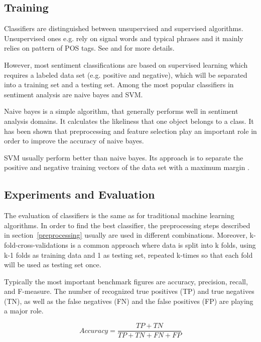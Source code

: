\documentclass{acm_proc_article-sp}
\begin{document}
\subsection{Training} Classifiers are distinguished between unsupervised and
supervised algorithms. Unsupervised ones e.g. rely on signal words and typical
phrases and it mainly relies on pattern of POS tags. See
\cite{liu2010sentimentanalysis} and \cite{pang2008opinion} for more details.

However, most sentiment classifications are based on supervised learning which
requires a labeled data set (e.g. positive and negative), which will be
separated into a training set and a testing set. Among the most popular
classifiers in sentiment analysis are naive bayes and SVM. 

Naive bayes is a simple algorithm, that generally performs well in sentiment
analysis domains. It calculates the likeliness that one object belongs to a
class. It has been shown that preprocessing and feature selection play an
important role in order to improve the accuracy of naive bayes.
\cite{ye2009sentiment, ting2011naive}

SVM usually perform better than naive bayes. Its approach is to separate the
positive and negative training vectors of the data set with a maximum margin
\cite{ye2009sentiment}.

\subsection{Experiments and Evaluation} The evaluation of classifiers is the
same as for traditional machine learning algorithms. In order to find the best
classifier, the preprocessing steps described in section~\ref{preprocessing}
usually are used in different combinations. Moreover, k-fold-cross-validations
is a common approach where data is split into k folds, using k-1 folds as
training data and 1 as testing set, repeated k-times so that each fold will be
used as testing set once. 

Typically the most important benchmark figures are accuracy, precision, recall,
and F-measure. The number of recognized true positives (TP) and true negatives
(TN), as well as the false negatives (FN) and the false positives (FP) are
playing a major role.  \cite{haddi2013therole, ting2011naive,
sokolova2006beyond, pak2010twitter, ye2009sentiment}


\begin{equation} Accuracy = \frac{TP+TN}{TP+TN+FN+FP} \end{equation}
\end{document}
